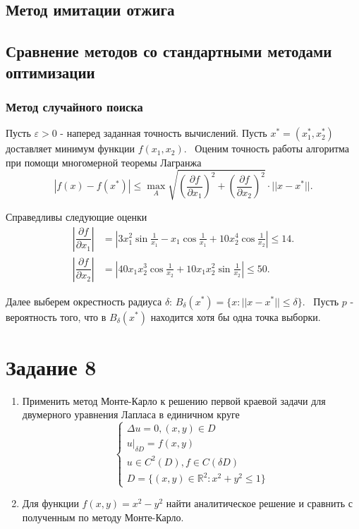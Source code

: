 \documentclass[11pt]{report}
\begin{document}
\subsection{Метод имитации отжига}

\subsection{Сравнение методов со стандартными методами оптимизации}

\subsubsection{Метод случайного поиска}

Пусть $\varepsilon>0$ - наперед заданная точность вычислений. Пусть $x^*=(x_1^*,x_2^*)$ доставляет минимум функции $f(x_1,x_2)$. \
Оценим точность работы алгоритма при помощи многомерной теоремы Лагранжа
$$
|f(x) - f(x^*)| \leqslant \max\limits_A 
\sqrt{\left(\dfrac{\partial f}{\partial x_1}\right)^2 + \left(\dfrac{\partial f}{\partial x_2}\right)^2} \cdot || x - x^* ||.
$$

Справедливы следующие оценки
$$
\begin{aligned}
\left|\dfrac{\partial f}{\partial x_1}\right| &= \left| 3x_1^2\sin\frac{1}{x_1} - x_1\cos\frac{1}{x_1} + 10x_2^4\cos\frac{1}{x_2}  \right| \leqslant 14. \\
\left|\dfrac{\partial f}{\partial x_2}\right| &= \left| 40x_1x_2^3\cos\frac{1}{x_2} + 10x_1x_2^2\sin\frac{1}{x_2} \right| \leqslant 50.
\end{aligned}
$$

Далее выберем окрестность радиуса $\delta$: $B_\delta(x^*)=\{ x: ||x-x^*||\leqslant \delta \}$. \
Пусть $p$ - вероятность того, что в $B_\delta(x^*)$ находится хотя бы одна точка выборки.


\section{Задание 8}

\begin{enumerate}

\item Применить метод Монте-Карло к решению первой краевой задачи для двумерного уравнения Лапласа в единичном круге
$$
\begin{cases}
\Delta u = 0,(x,y)\in D \\
u\vert_{\delta D} = f(x,y) \\
u\in C^2(D), f\in C(\delta D) \\
D=\{(x,y)\in\mathbb{R}^2: x^2+y^2\leqslant 1 \}
\end{cases}
$$

\item Для функции $f(x,y) = x^2-y^2$ найти аналитическое решение и сравнить с полученным по методу Монте-Карло.

\end{enumerate}
\end{document}
